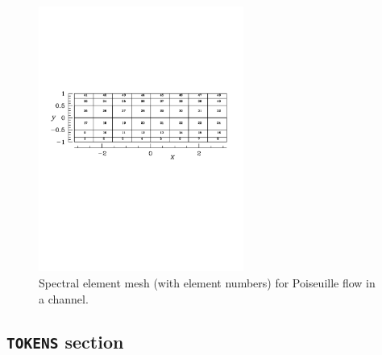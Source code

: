 \documentclass[11pt,a4paper]{report}
\begin{document}
\begin{figure}
\begin{center}
\includegraphics[width=0.6\textwidth]{channel_mesh}
\end{center}
\caption{Spectral element mesh (with element numbers) for Poiseuille
  flow in a channel.}
\label{fig.chanmesh}
\end{figure}

\subsection{\texttt{TOKENS} section}
\end{document}
